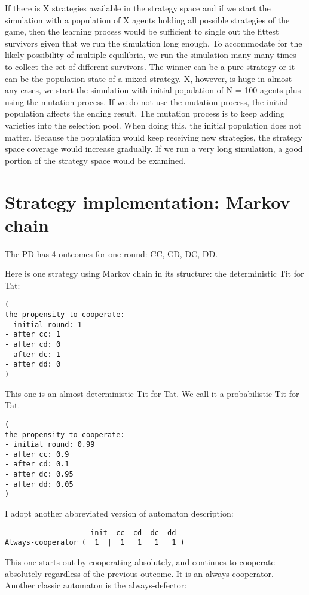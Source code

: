 \documentclass[12.5pt]{report}
\begin{document}
If there is X strategies available in the strategy space and if we start the simulation with a population of X agents holding all possible strategies of the game, then the learning process would be sufficient to single out the fittest survivors given that we run the simulation long enough. To accommodate for the likely possibility of multiple equilibria, we run the simulation many many times to collect the set of different survivors. The winner can be a pure strategy or it can be the population state of a mixed strategy. X, however, is huge in almost any cases, we start the simulation with initial population of N = 100 agents plus using the mutation process. If we do not use the mutation process, the initial population affects the ending result. The mutation process is to keep adding varieties into the selection pool. When doing this, the initial population does not matter. Because the population would keep receiving new strategies, the strategy space coverage would increase gradually. If we run a very long simulation, a good portion of the strategy space would be examined. 

\section{Strategy implementation: Markov chain}

The PD has 4 outcomes for one round: CC, CD, DC, DD.

Here is one strategy using Markov chain in its structure: the deterministic Tit for Tat:

\begin{verbatim}
(
the propensity to cooperate:
- initial round: 1
- after cc: 1
- after cd: 0 
- after dc: 1 
- after dd: 0
)
\end{verbatim}

This one is an almost deterministic Tit for Tat. We call it a probabilistic Tit for Tat.
\begin{verbatim}
(
the propensity to cooperate:
- initial round: 0.99
- after cc: 0.9
- after cd: 0.1
- after dc: 0.95
- after dd: 0.05
)
\end{verbatim}

I adopt another abbreviated version of automaton description:

\begin{verbatim}
                    init  cc  cd  dc  dd 
Always-cooperator (  1  |  1   1   1   1 )
\end{verbatim}

This one starts out by cooperating absolutely, and continues to cooperate absolutely regardless of the previous outcome. It is an always cooperator. Another classic automaton is the always-defector:
\end{document}
